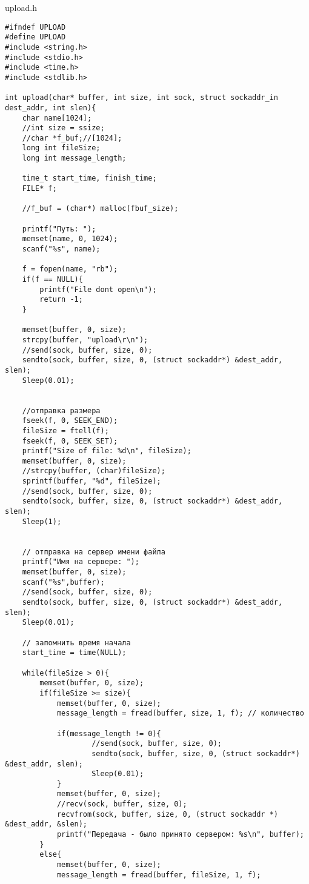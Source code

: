 \documentclass[12pt,a4paper]{report}
\begin{document}
upload.h
\begin{lstlisting}
#ifndef UPLOAD
#define UPLOAD
#include <string.h>
#include <stdio.h>
#include <time.h>
#include <stdlib.h>

int upload(char* buffer, int size, int sock, struct sockaddr_in dest_addr, int slen){
    char name[1024];
	//int size = ssize;
	//char *f_buf;//[1024];
    long int fileSize;
    long int message_length;

	time_t start_time, finish_time;
    FILE* f;

	//f_buf = (char*) malloc(fbuf_size);

    printf("Путь: ");
    memset(name, 0, 1024);
    scanf("%s", name);

    f = fopen(name, "rb");
    if(f == NULL){
        printf("File dont open\n");
        return -1;
    }

    memset(buffer, 0, size);
    strcpy(buffer, "upload\r\n");
    //send(sock, buffer, size, 0);
	sendto(sock, buffer, size, 0, (struct sockaddr*) &dest_addr, slen);
	Sleep(0.01);
	   

    //отправка размера
    fseek(f, 0, SEEK_END);
    fileSize = ftell(f);
    fseek(f, 0, SEEK_SET);
    printf("Size of file: %d\n", fileSize);
    memset(buffer, 0, size);
    //strcpy(buffer, (char)fileSize);
    sprintf(buffer, "%d", fileSize);
    //send(sock, buffer, size, 0);
	sendto(sock, buffer, size, 0, (struct sockaddr*) &dest_addr, slen);
	Sleep(1);


	// отправка на сервер имени файла
    printf("Имя на сервере: ");
    memset(buffer, 0, size);
    scanf("%s",buffer);
    //send(sock, buffer, size, 0);
	sendto(sock, buffer, size, 0, (struct sockaddr*) &dest_addr, slen);
	Sleep(0.01);

	// запомнить время начала
	start_time = time(NULL);
    
	while(fileSize > 0){
        memset(buffer, 0, size);
        if(fileSize >= size){
			memset(buffer, 0, size);
            message_length = fread(buffer, size, 1, f); // количество

            if(message_length != 0){
                    //send(sock, buffer, size, 0);
					sendto(sock, buffer, size, 0, (struct sockaddr*) &dest_addr, slen);
					Sleep(0.01);
			}
            memset(buffer, 0, size);
            //recv(sock, buffer, size, 0);
			recvfrom(sock, buffer, size, 0, (struct sockaddr *) &dest_addr, &slen);
            printf("Передача - было принято сервером: %s\n", buffer);
        }
        else{
			memset(buffer, 0, size);
            message_length = fread(buffer, fileSize, 1, f);


\end{lstlisting}
\end{document}

